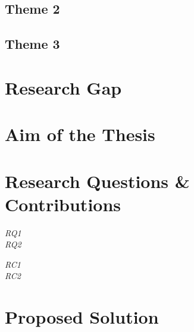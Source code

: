 \documentclass[10pt,a4paper]{article}
\begin{document}
    \subsection{Theme 2}
    \lipsum[1-3]
    
    \subsection{Theme 3}
    \lipsum[3-5]
    
    \section{Research Gap}
    \lipsum[4][1-6]
    
    \section{Aim of the Thesis}
    \lipsum[5][2-6]
    
    \section{Research Questions \& Contributions}
    \lipsum[1][1-4]
    \begin{description}
        \item[\textit{RQ1}] \lipsum[2][1]
        \item[\textit{RQ2}] \lipsum[3][1]
    \end{description}

    \lipsum[2][1-4]
    \begin{description}
        \item[\textit{RC1}] \lipsum[2][1]
        \item[\textit{RC2}] \lipsum[3][1]
    \end{description}
       
    \section{Proposed Solution}
    \lipsum[1-4]
    
\end{document}
